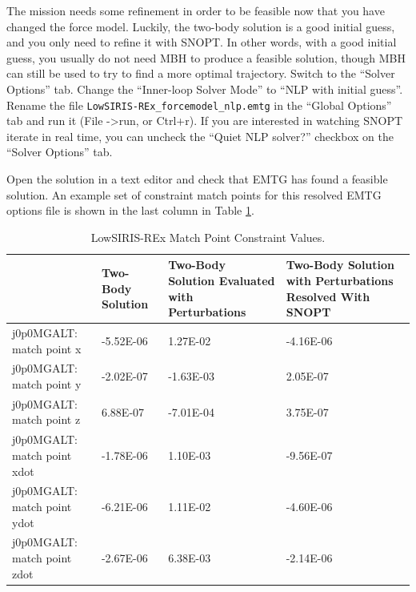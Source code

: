 \documentclass[11pt]{article}
\begin{document}
The mission needs some refinement in order to be feasible now that you have changed the force model. Luckily, the two-body solution is a good initial guess, and you only need to refine it with \acs{SNOPT}. In other words, with a good initial guess, you usually do not need \ac{MBH} to produce a feasible solution, though \ac{MBH} can still be used to try to find a more optimal trajectory. Switch to the ``Solver Options'' tab. Change the ``Inner-loop Solver Mode'' to ``\acs{NLP} with initial guess''. Rename the file \texttt{LowSIRIS-REx\_forcemodel\_nlp.emtg} in the ``Global Options'' tab and run it (File -\textgreater run, or Ctrl+r). If you are interested in watching \acs{SNOPT} iterate in real time, you can uncheck the ``Quiet \acs{NLP} solver?'' checkbox on the ``Solver Options'' tab.

\noindent Open the solution in a text editor and check that \ac{EMTG} has found a feasible solution. An example set of constraint match points for this resolved \ac{EMTG} options file is shown in the last column in Table \ref{tab:match_point_constraint_values}.

\begin{table}[H]
	\begin{small}
		\begin{tabularx}{\linewidth} { >{\arraybackslash} X >{\centering\arraybackslash} X >{\centering\arraybackslash} X >{\centering\arraybackslash} X}
			\hline
			 & Two-Body Solution & Two-Body Solution Evaluated with Perturbations & Two-Body Solution with Perturbations Resolved With \acs{SNOPT} \\
			\hline 
			j0p0MGALT: match point x\newline & -5.52E-06 & 1.27E-02 & -4.16E-06 \\ 
			j0p0MGALT: match point y\newline & -2.02E-07 & -1.63E-03 & 2.05E-07 \\ 
			j0p0MGALT: match point z\newline & 6.88E-07 & -7.01E-04 & 3.75E-07 \\
			j0p0MGALT: match point xdot\newline & -1.78E-06 & 1.10E-03 & -9.56E-07 \\
			j0p0MGALT: match point ydot\newline & -6.21E-06 & 1.11E-02 & -4.60E-06 \\
			j0p0MGALT: match point zdot & -2.67E-06 & 6.38E-03 & -2.14E-06 \\
 			\hline
		\end{tabularx}
	\end{small}
	\caption{\label{tab:match_point_constraint_values}LowSIRIS-REx Match Point Constraint Values.}
\end{table}
\end{document}

